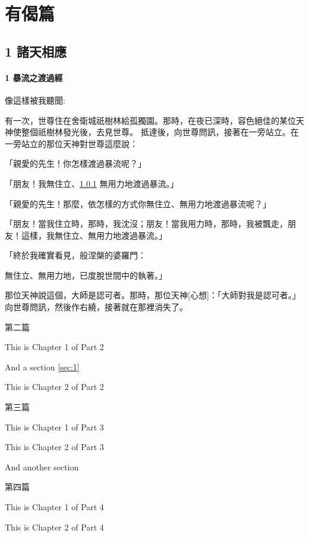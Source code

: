 \documentclass[a5paper,12pt]{book}
\begin{document}

\part[sort=有]{有偈篇}

\chapter{1 諸天相應}\label{ch:1-諸天相應}



\subsection{1 暴流之渡過經}\label{subsec:1}

像這樣被我聽聞:

有一次，世尊住在舍衛城祇樹林給孤獨園。那時，在夜已深時，容色絕佳的某位天神使整個祇樹林發光後，去見世尊。
抵達後，向世尊問訊，接著在一旁站立。在一旁站立的那位天神對世尊這麼說：

「親愛的先生！你怎樣渡過暴流呢？」

「朋友！我無住立、\ref{subsec:1} 無用力地渡過暴流。」

「親愛的先生！那麼，依怎樣的方式你無住立、無用力地渡過暴流呢？」

「朋友！當我住立時，那時，我沈沒；朋友！當我用力時，那時，我被飄走，朋友！這樣，我無住立、無用力地渡過暴流。」

「終於我確實看見，般涅槃的婆羅門：

無住立、無用力地，已度脫世間中的執著。」

那位天神說這個，大師是認可者。那時，那位天神[心想]：「大師對我是認可者。」向世尊問訊，然後作右繞，接著就在那裡消失了。

\clearpage

第二篇
This is Chapter 1 of Part 2
And a section \ref{sec:1}
\clearpage
This is Chapter 2 of Part 2
\clearpage

第三篇
This is Chapter 1 of Part 3
\clearpage
This is Chapter 2 of Part 3
And another section
\clearpage
第四篇
This is Chapter 1 of Part 4
\clearpage
This is Chapter 2 of Part 4
\clearpage
\end{document}
